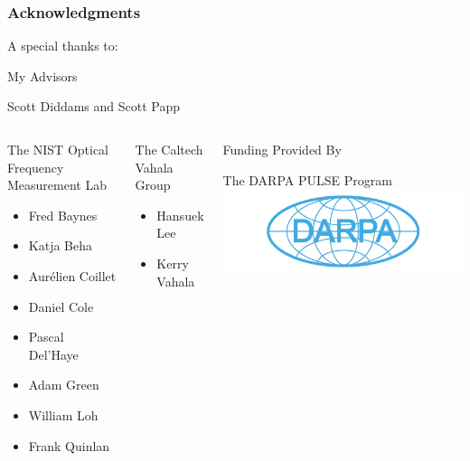 \documentclass{beamer}
\begin{document}
\begin{frame}\frametitle{Acknowledgments}
A special thanks to:
\begin{block}{\centering My Advisors}
\begin{center}
Scott Diddams and Scott Papp
\end{center}
\end{block}

\begin{columns}
\begin{block}{\centering The NIST Optical Frequency Measurement Lab}
\begin{itemize}
\small
\item Fred Baynes
\item Katja Beha
\item Aur\'{e}lien Coillet
\item Daniel Cole
\item Pascal Del'Haye
\item Adam Green
\item William Loh
\item Frank Quinlan
\end{itemize}
\end{block}

\begin{block}{\centering The Caltech Vahala Group}
\begin{itemize}
\small
\item Hansuek Lee
\item Kerry Vahala
\end{itemize}
\end{block}

\begin{block}{\centering Funding Provided By}
\begin{center}
\small
The DARPA PULSE Program
\includegraphics[width=1.1\textwidth]{Images/DARPA_logo.png}
\end{center}
\end{block}

\end{columns}
\end{frame}
\end{document}
